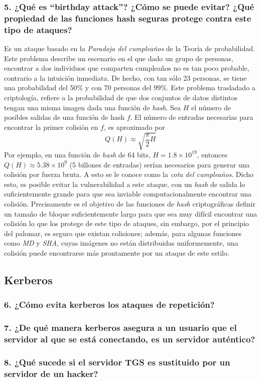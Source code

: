 \documentclass[12pt]{article}
\begin{document}
\subsubsection*{5. ¿Qué es “birthday attack”? ¿Cómo se puede evitar? ¿Qué propiedad de las funciones hash seguras protege contra este tipo de ataques?}
Es un ataque basado en la \textit{Paradoja del cumpleaños} de la Teoría
de probabilidad. Este problema describe un escenario en el que dado un
grupo de personas, encontrar a dos individuos que comparten cumpleaños
no es tan poco probable, contrario a la intuición inmediata. De hecho,
con tan sólo 23 personas, se tiene una probabilidad del 50\% y con 70 personas del 99\%. Este problema trasladado a criptología, refiere a la
probabilidad de que dos conjuntos de datos distintos tengan una misma
imagen dada una función de \textit{hash}.
Sea $H$ el número de posibles salidas de una función de hash $f$. El número de entradas necesarias para encontrar la primer colisión en $f$, es aproximado por
\begin{equation}
  Q(H) \approx \sqrt{\frac{\pi}{2}H}
\end{equation}
Por ejemplo, en una función de \textit{hash} de 64 bits, $H = 1.8 \times 10^{19}$, entonces $Q(H) \approx 5.38 \times 10^{9}$ (5 billones de entradas) serían necesarios para generar una colisión por fuerza bruta. A esto se le conoce como la \textit{cota del cumpleaños}. Dicho esto, es posible evitar la vulnerabilidad a este ataque, con un \textit{hash} de salida lo suficientemente grande para que sea inviable computacionalmente encontrar una colisión. Precisamente es el objetivo de las funciones de \textit{hash} criptográficas definir un tamaño de bloque suficientemente
largo para que sea muy difícil encontrar una colisión lo que los protege
de este tipo de ataques, sin embargo, por el principio del palomar,
es seguro que existan colisiones; además, para algunas funciones como
\textit{MD} y \textit{SHA}, cuyas imágenes no están distribuidas uniformemente, una colisión puede encontrarse más prontamente por un ataque de este estilo.

\subsection*{Kerberos}
\subsubsection*{6. ¿Cómo evita kerberos los ataques de repetición?}

\subsubsection*{7. ¿De qué manera kerberos asegura a un usuario que el servidor al que se está conectando, es un 
servidor auténtico?}

\subsubsection*{8. ¿Qué sucede si el servidor TGS es sustituido por un servidor de un hacker? }
\end{document}
